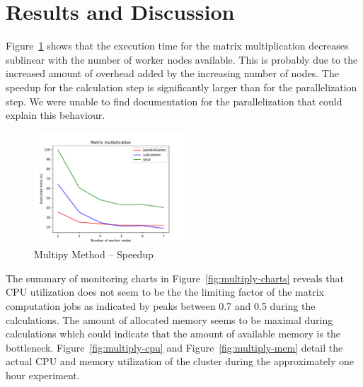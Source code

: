 \documentclass{prog_report}
\begin{document}
\section{Results and Discussion}


Figure~\ref{fig:multiply} shows that the execution time for the matrix multiplication decreases sublinear with the number of worker nodes available. This is probably due to the increased amount of overhead added by the increasing number of nodes. 
The speedup for the calculation step is significantly larger than for the parallelization step. We were unable to find documentation for the parallelization that could explain this behaviour.

\begin{figure}
    \centering
    \includegraphics[width=0.5\textwidth]{img/multiply-speedup.pdf}
    \caption{Multipy Method – Speedup}
    \label{fig:multiply}
\end{figure}

The summary of monitoring charts in Figure~\ref{fig:multiply-charts} reveals that CPU utilization does not seem to be the the limiting factor of the matrix computation jobs as indicated by peaks between 0.7 and 0.5 during the calculations. 
The amount of allocated memory seems to be maximal during calculations which could indicate that the amount of available memory is the bottleneck.
Figure~\ref{fig:multiply-cpu} and Figure~\ref{fig:multiply-mem} detail the actual CPU and memory utilization of the cluster during the approximately one hour experiment.
\end{document}
